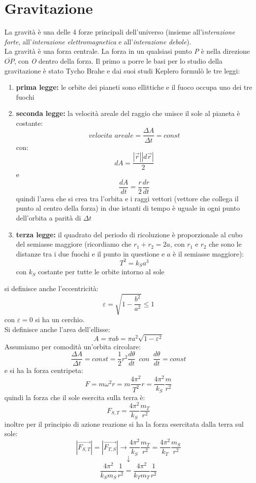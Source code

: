 \documentclass[a4paper,12pt, oneside]{book}
\begin{document}
\section{Gravitazione}
La gravità è una delle 4 forze principali dell'universo (insieme all'i\textit{nterazione forte}, all'\textit{interazione elettromagnetica} e all'\textit{interazione debole}). \\
La gravità è una forza centrale. La forza in un qualsiasi punto \textit{P} è nella direzione $\overline{OP}$, con \textit{O} dentro della forza. Il primo a porre le basi per lo studio della gravitazione è stato Tycho Brahe e dai suoi studi Keplero formulò le tre leggi:
\begin{enumerate}
\item \textbf{prima legge:} le orbite dei pianeti sono ellittiche e il fuoco occupa uno dei tre fuochi
\item \textbf{seconda legge:} la velocità areale del raggio che unisce il sole al pianeta è costante:
$$velocita\,\,areale=\frac{\Delta A}{\Delta t}=const$$
con:
$$dA=\frac{|\vec{r}||d\vec{r}|}{2}$$
e 
$$\frac{dA}{dt}=\frac{r}{2}\frac{dr}{dt}$$
quindi l'area che si crea tra l'orbita e i raggi vettori (vettore che collega il punto al centro della forza) in due istanti di tempo è uguale in ogni punto dell'orbita a parità di $\Delta t$
\item \textbf{terza legge:} il quadrato del periodo di ricoluzione è proporzionale al cubo del semiasse maggiore (ricordiamo che $r_1+r_2=2a$, con $r_1$ e $r_2$ che sono le distanze tra i due fuochi e il punto in questione e $a$ è il semiasse maggiore):
$$T^2=k_Sa^3$$
con $k_S$ costante per tutte le orbite intorno al sole
\end{enumerate}
si definisce anche l'eccentricità:
$$\varepsilon=\sqrt{1-\frac{b^2}{a^2}}\leq 1$$
con $\varepsilon=0$ si ha un cerchio.\\
Si definisce anche l'area dell'ellisse:
$$A=\pi ab=\pi a^2 \sqrt{1-\varepsilon^2}$$
Assumiamo per comodità un'orbita circolare:
$$\frac{\Delta A}{\Delta t}=const=\frac{1}{2}r^2\frac{d\theta}{dt}\,\,\, con\,\,\, \frac{d\theta}{dt}=const$$
e si ha la forza centripeta:
$$F=m\omega^2r=m\frac{4\pi^2}{T^2}r=\frac{4\pi^2}{k_S}\frac{m}{r^2}$$
quindi la forza che il sole esercita sulla terra è:
$$F_{S,T}=\frac{4\pi^2}{k_S}\frac{m_T}{r^2}$$
inoltre per il principio di azione reazione si ha la forza esercitata dalla terra sul sole:
$$|\vec{F_{S,T}}|=|\vec{F_{T,S}}|\to \frac{4\pi^2}{k_S}\frac{m_T}{r^2}=\frac{4\pi^2}{k_T}\frac{m_S}{r^2}$$
$$\downarrow$$
$$\frac{4\pi^2}{k_Sm_S}\frac{1}{r^2}=\frac{4\pi^2}{k_Tm_T}\frac{1}{r^2}$$
\end{document}
